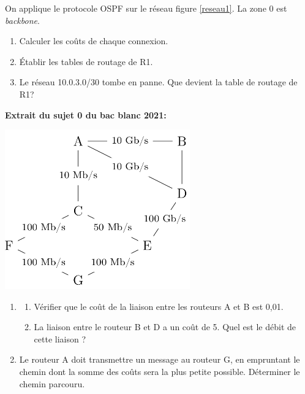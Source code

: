 \documentclass[a4paper,11pt]{article}
\begin{document}
\begin{exo}
\begin{center}
        \label{reseau1}
    \end{center}
    On applique le protocole OSPF sur le réseau figure \ref{reseau1}. La zone 0 est \emph{backbone}.
    \begin{enumerate}
        \item Calculer les coûts de chaque connexion.
        \item Établir les tables de routage de R1.
        \item Le réseau 10.0.3.0/30 tombe en panne. Que devient la table de routage de R1?
    \end{enumerate}
\end{exo}
\begin{exo}
\textbf{Extrait du sujet 0 du bac blanc 2021: }
\begin{center}
\centering
\includegraphics[width=8cm]{ressources/bacblanc.png}
\label{IMG}
\end{center}
\begin{enumerate}
    \item \begin{enumerate}
        \item Vérifier que le coût de la liaison entre les routeurs A et B est 0,01.
        \item La liaison entre le routeur B et D a un coût de 5. Quel est le débit de cette liaison ?
    \end{enumerate}
    \item Le routeur A doit transmettre un message au routeur G, en empruntant le chemin dont la somme des coûts sera la plus petite possible. Déterminer le chemin parcouru.
\end{enumerate}
\end{exo}
\end{document}
